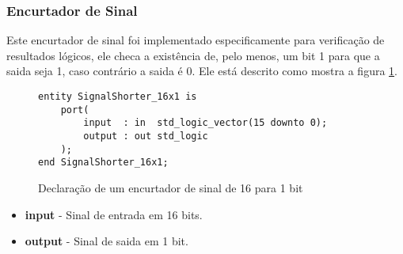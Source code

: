 \documentclass{article}
\newcommand\tab[1][0.50cm]{\hspace*{#1}}
\begin{document}
			\subsubsection{Encurtador de Sinal}
			\tab Este encurtador de sinal foi implementado especificamente para verifica\c{c}\~{a}o de resultados l\'{o}gicos, ele checa a exist\^{e}ncia de, pelo menos, um bit 1 para que a saida seja 1, caso contr\'{a}rio a saida \'{e} 0. Ele est\'{a} descrito como mostra a figura \ref{fig:SignalShorter_16x1}.
			\begin{figure}[H]
				\centering
				\caption[Encurtador de sinal de 16 para 1 bit]{Declara\c{c}\~{a}o de um encurtador de sinal de 16 para 1 bit}
				\label{fig:SignalShorter_16x1}
				\begin{lstlisting}[style=vhdl]
entity SignalShorter_16x1 is
	port(
		input  : in  std_logic_vector(15 downto 0);
		output : out std_logic
	);
end SignalShorter_16x1;
				\end{lstlisting}
			\end{figure}
				\begin{itemize}
					\item \textbf{input} - Sinal de entrada em 16 bits.
					\item \textbf{output} - Sinal de saida em 1 bit.
				\end{itemize}
\end{document}

